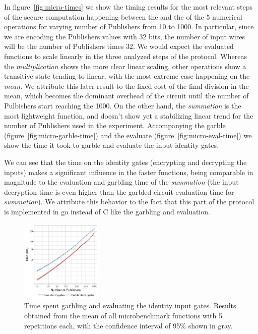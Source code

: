 In figure~\ref{fig:micro-times} we show the timing results for the most
relevant steps of the secure computation happening between the \broker and the
\garbler of the 5 numerical operations for varying number of Publishers from 10
to 1000.  In particular, since we are encoding the Publishers values with 32
bits, the number of input wires will be the number of Publishers times 32.  We
would expect the evaluated functions to scale linearly in the three analyzed
steps of the protocol.  Whereas the \emph{multiplication} shows the more clear
linear scaling, other operations show a transitive state tending to linear,
with the most extreme case happening on the \emph{mean}.  We attribute this
later result to the fixed cost of the final division in the mean, which becomes
the dominant overhead of the circuit until the number of Pulbishers start
reaching the 1000.  On the other hand, the \emph{summation} is the most
lightweight function, and doesn't show yet a stabilizing linear trend for the
number of Publishers used in the experiment.  Accompanying the garble
(figure~\ref{fig:micro-garble-time}) and the evaluate
(figure~\ref{fig:micro-eval-time}) we show the time it took to garble and
evaluate the input identity gates.

We can see that the time on the identity gates (encrypting and decrypting the
inputs) makes a significant influence in the faster functions, being comparable
in magnitude to the evaluation and garbling time of the \emph{summation}
(the input decryption time is even higher than the garbled circuit evaluation
time for \emph{summation}).  We attribute this behavior to the fact that this
part of the protocol is implemented in go instead of C like the garbling and
evaluation.

\begin{figure}
  \includegraphics[width=0.35\textwidth]{plots/enc_dec.png}
  \caption{Time spent garbling and evaluating the identity input gates.
    Results obtained from the mean of all microbenchmark functions with 5
    repetitions each, with the confidence interval of 95\% shown in gray.}
  \label{micro-inputs}
\end{figure}

